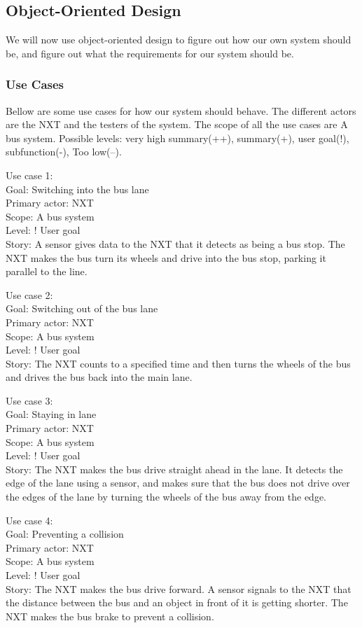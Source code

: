 \subsection{Object-Oriented Design}

We will now use object-oriented design to figure out how our own system should be, and figure out what the requirements for our system should be.

\subsubsection{Use Cases}
Bellow are some use cases for how our system should behave. The different actors are the NXT and the testers of the system. The scope of all the use cases are A bus system. Possible levels: very high summary(++), summary(+), user goal(!), subfunction(-), Too low(--).

Use case 1:\\
Goal: Switching into the bus lane\\
Primary actor: NXT\\
Scope: A bus system\\
Level: ! User goal\\
Story: A sensor gives data to the NXT that it detects as being a bus stop. The NXT makes the bus turn its wheels and drive into the bus stop, parking it parallel to the line.

Use case 2:\\
Goal: Switching out of the bus lane\\
Primary actor: NXT\\
Scope: A bus system\\
Level: ! User goal\\
Story: The NXT counts to a specified time and then turns the wheels of the bus and drives the bus back into the main lane.

Use case 3:\\
Goal: Staying in lane\\
Primary actor: NXT\\
Scope: A bus system\\
Level: ! User goal\\
Story: The NXT makes the bus drive straight ahead in the lane. It detects the edge of the lane using a sensor, and makes sure that the bus does not drive over the edges of the lane by turning the wheels of the bus away from the edge.

Use case 4:\\
Goal: Preventing a collision\\
Primary actor: NXT\\
Scope: A bus system\\
Level: ! User goal\\
Story: The NXT makes the bus drive forward. A sensor signals to the NXT that the distance between the bus and an object in front of it is getting shorter. The NXT makes the bus brake to prevent a collision.

